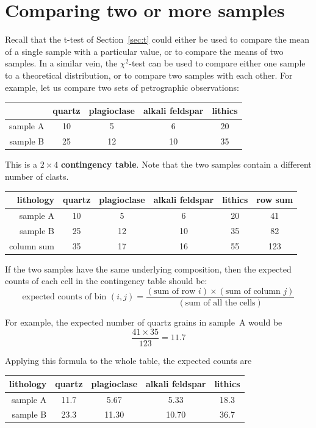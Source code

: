 \section{Comparing two or more samples}
\label{sec:contingency}

Recall that the t-test of Section~\ref{sec:t} could either be used to
compare the mean of a single sample with a particular value, or to
compare the means of two samples. In a similar vein, the $\chi^2$-test
can be used to compare either one sample to a theoretical
distribution, or to compare two samples with each other. For example,
let us compare two sets of petrographic observations:

\begin{center}
  \begin{tabular}{r|cccc}
~ & quartz & plagioclase & alkali feldspar & lithics \\ \hline
sample A & 10 & 5 & 6 & 20 \\
sample B & 25 & 12 & 10 & 35
  \end{tabular}
  \label{tab:observedclasts}
\end{center}

This is a ${2}\times{4}$ \textbf{contingency table}. Note that the two
samples contain a different number of clasts.

\begin{center}
  \begin{tabular}{r|cccc|c}
lithology & quartz & plagioclase & alkali feldspar & lithics & row sum \\ \hline
sample A & 10 & 5 & 6 & 20 & 41\\
sample B & 25 & 12 & 10 & 35 & 82 \\ \hline
column sum & 35 & 17 & 16 & 55 & 123
  \end{tabular}
\end{center}

If the two samples have the same underlying composition, then the
expected counts of each cell in the contingency table should be:
\[
\mbox{expected counts of bin }(i,j) =
\frac{(\mbox{sum of row }i)\times(\mbox{sum of column }j)}
     {(\mbox{sum of all the cells})}
\]

For example, the expected number of quartz grains in sample~A would be
\[
\frac{41\times35}{123}=11.7
\]

Applying this formula to the whole table, the expected counts are

\begin{center}
  \begin{tabular}{r|cccc}
lithology & quartz & plagioclase & alkali feldspar & lithics \\ \hline
sample A & 11.7 & 5.67 & 5.33 & 18.3 \\
sample B & 23.3 & 11.30 & 10.70 & 36.7
  \end{tabular}
  \label{tab:expectedclasts}
\end{center}

